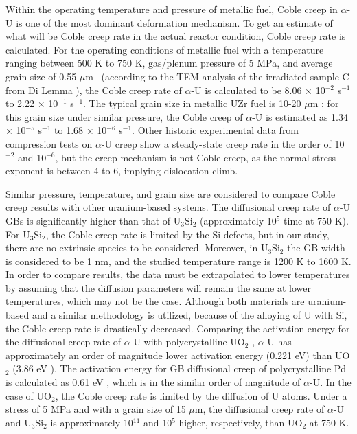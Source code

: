\documentclass[review]{elsarticle}
\begin{document}
Within the operating temperature and pressure of metallic fuel, Coble creep in $\alpha$-U is one of the most dominant deformation mechanism. To get an estimate of what will be Coble creep rate in the actual reactor condition, Coble creep rate is calculated. For the operating conditions of metallic fuel \cite{recent_review} with a temperature ranging between 500 K to 750 K, gas/plenum pressure of 5 MPa, and average grain size of 0.55 $\mu$m \ (according to the TEM analysis of the irradiated sample C from Di Lemma \cite{DILEMMA2020152467}), the Coble creep rate of $\alpha$-U is calculated to be 8.06 $\times$ 10$^{-2}$ s$^{-1}$ to 2.22 $\times$ 10$^{-1}$ s$^{-1}$. The typical grain size in metallic UZr fuel is 10-20 $\mu$m \cite{osti_1469797}; for this grain size under similar pressure, the Coble creep of $\alpha$-U is estimated as 1.34 $\times$ 10$^{-5}$ s$^{-1}$ to 1.68 $\times$ 10$^{-6}$ s$^{-1}$. Other historic experimental data \cite{ROBINSON1973293} from compression tests on $\alpha$-U creep show a steady-state creep rate in the order of 10$^{-2}$ and 10$^{-6}$, but the creep mechanism is not Coble creep, as the normal stress exponent is between 4 to 6, implying dislocation climb. 

Similar pressure, temperature, and grain size are considered to compare Coble creep results with other uranium-based systems. The diffusional creep rate of $\alpha$-U GBs is significantly higher than that of U$_\mathrm{3}$Si$_\mathrm{2}$ (approximately 10$^{5}$ time at 750 K). For U$_\mathrm{3}$Si$_\mathrm{2}$, the Coble creep rate is limited by the Si defects, but in our study, there are no extrinsic species to be considered. Moreover, in U$_\mathrm{3}$Si$_\mathrm{2}$ \cite{COOPER2021153129} the GB width is considered to be 1 nm, and the studied temperature range is 1200 K to 1600 K. In order to compare results, the data must be extrapolated to lower temperatures by assuming that the diffusion parameters will remain the same at lower temperatures, which may not be the case. Although both materials are uranium-based and a similar methodology is utilized, because of the alloying of U with Si, the Coble creep rate is drastically decreased. Comparing the activation energy for the diffusional creep rate of $\alpha$-U with polycrystalline UO$_\mathrm{2}$ \cite{DESAI20084489}, $\alpha$-U has approximately an order of magnitude lower activation energy (0.221 eV) than UO$_\mathrm{2}$ (3.86 eV \cite{DESAI20084489}). The activation energy for GB diffusional creep of polycrystalline Pd is calculated as 0.61 eV \cite{YAMAKOV200261_Pd_creep}, which is in the similar order of magnitude of $\alpha$-U. In the case of UO$_2$, the Coble creep rate is limited by the diffusion of U atoms. Under a stress of 5 MPa and with a grain size of 15 $\mu$m, the diffusional creep rate of $\alpha$-U and U$_\mathrm{3}$Si$_\mathrm{2}$ is approximately 10$^{11}$ and 10$^{5}$ higher, respectively, than UO$_\mathrm{2}$ at 750 K.  
\end{document}
